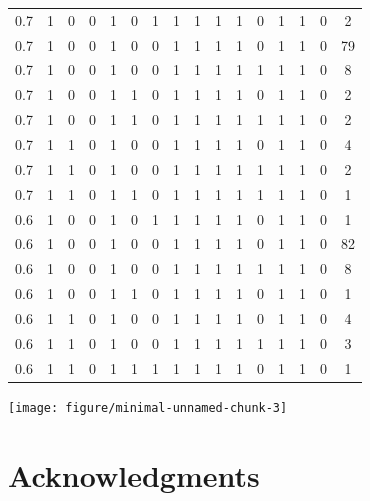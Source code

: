 \documentclass[12pt, letter]{article}\usepackage[]{graphicx}\usepackage[]{color}
\newenvironment{knitrout}{}{} %
\begin{document}
\begin{table}[ht]
{\begin{tabular}{|c|cccccccccccccc|c|}
   \hline
0.7 & 1 & 0 & 0 & 1 & 0 & 1 & 1 & 1 & 1 & 1 & 0 & 1 & 1 & 0 & 2 \\ 
  0.7 & 1 & 0 & 0 & 1 & 0 & 0 & 1 & 1 & 1 & 1 & 0 & 1 & 1 & 0 & 79 \\ 
  0.7 & 1 & 0 & 0 & 1 & 0 & 0 & 1 & 1 & 1 & 1 & 1 & 1 & 1 & 0 & 8 \\ 
  0.7 & 1 & 0 & 0 & 1 & 1 & 0 & 1 & 1 & 1 & 1 & 0 & 1 & 1 & 0 & 2 \\ 
  0.7 & 1 & 0 & 0 & 1 & 1 & 0 & 1 & 1 & 1 & 1 & 1 & 1 & 1 & 0 & 2 \\ 
  0.7 & 1 & 1 & 0 & 1 & 0 & 0 & 1 & 1 & 1 & 1 & 0 & 1 & 1 & 0 & 4 \\ 
  0.7 & 1 & 1 & 0 & 1 & 0 & 0 & 1 & 1 & 1 & 1 & 1 & 1 & 1 & 0 & 2 \\ 
  0.7 & 1 & 1 & 0 & 1 & 1 & 0 & 1 & 1 & 1 & 1 & 1 & 1 & 1 & 0 & 1 \\ 
   \hline
0.6 & 1 & 0 & 0 & 1 & 0 & 1 & 1 & 1 & 1 & 1 & 0 & 1 & 1 & 0 & 1 \\ 
  0.6 & 1 & 0 & 0 & 1 & 0 & 0 & 1 & 1 & 1 & 1 & 0 & 1 & 1 & 0 & 82 \\ 
  0.6 & 1 & 0 & 0 & 1 & 0 & 0 & 1 & 1 & 1 & 1 & 1 & 1 & 1 & 0 & 8 \\ 
  0.6 & 1 & 0 & 0 & 1 & 1 & 0 & 1 & 1 & 1 & 1 & 0 & 1 & 1 & 0 & 1 \\ 
  0.6 & 1 & 1 & 0 & 1 & 0 & 0 & 1 & 1 & 1 & 1 & 0 & 1 & 1 & 0 & 4 \\ 
  0.6 & 1 & 1 & 0 & 1 & 0 & 0 & 1 & 1 & 1 & 1 & 1 & 1 & 1 & 0 & 3 \\ 
  0.6 & 1 & 1 & 0 & 1 & 1 & 1 & 1 & 1 & 1 & 1 & 0 & 1 & 1 & 0 & 1 \\ 
   \hline
\end{tabular}
}
\end{table}


\newpage

\begin{knitrout}
\color{fgcolor}

{\centering \texttt{[image: figure/minimal-unnamed-chunk-3]} 

}



\end{knitrout}

\section*{Acknowledgments}

\end{document}
